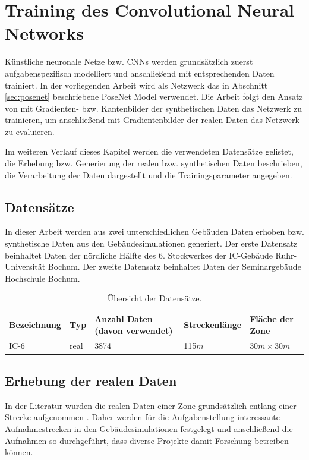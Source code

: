 
\section{Training des Convolutional Neural Networks}
Künstliche neuronale Netze bzw. CNNs werden grundsätzlich zuerst aufgabenspezifisch modelliert und anschließend mit entsprechenden Daten trainiert.  In der vorliegenden Arbeit wird als Netzwerk das in Abschnitt \ref{sec:posenet} beschriebene PoseNet Model verwendet. Die Arbeit folgt den Ansatz von \citet{acharyaBIMPoseNetIndoorCamera2019} mit Gradienten- bzw. Kantenbilder der synthetischen Daten das Netzwerk zu trainieren, um anschließend mit Gradientenbilder der realen Daten das Netzwerk zu evaluieren. 

Im weiteren Verlauf dieses Kapitel werden die verwendeten Datensätze gelistet, die Erhebung bzw. Generierung der realen bzw. synthetischen Daten beschrieben, die Verarbeitung der Daten dargestellt und die Trainingsparameter angegeben. 


\subsection{Datensätze}
\label{subsec:datasets}
In dieser Arbeit werden aus zwei unterschiedlichen Gebäuden Daten erhoben bzw. synthetische Daten aus den Gebäudesimulationen generiert. 
Der erste Datensatz beinhaltet Daten der nördliche Hälfte des 6. Stockwerkes der IC-Gebäude Ruhr-Universität Bochum. Der zweite Datensatz beinhaltet Daten der Seminargebäude Hochschule Bochum.


\begin{table}[H]
	\centering
	\caption{Übersicht der Datensätze.}
	\begin{tabularx}{1.0\textwidth}{>{\hsize=0.1\hsize}X >{\hsize=0.7\hsize}X X X X}
		\textbf{Bezeichnung} & \textbf{Typ}  & \textbf{Anzahl Daten} (davon verwendet) & \textbf{Streckenlänge} & \textbf{Fläche der Zone}\\
		\hline
		IC-6 & real & 3874 & 115$m$ & $30m \times 30m$\\
	\end{tabularx}
	\label{tab:trainingparams}
\end{table}


\newpage
\subsection{Erhebung der realen Daten}
\label{subsec:record_real_data}
In der Literatur wurden die realen Daten einer Zone grundsätzlich entlang einer Strecke aufgenommen \cite{kendallPoseNetConvolutionalNetwork2015, clarkVidLocDeepSpatioTemporal2017, acharyaBIMPoseNetIndoorCamera2019}. Daher werden für die Aufgabenstellung interessante Aufnahmestrecken in den Gebäudesimulationen festgelegt und anschließend die Aufnahmen so durchgeführt, dass diverse Projekte damit Forschung betreiben können. 

